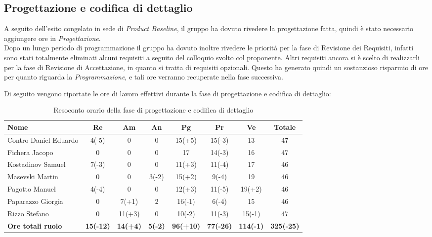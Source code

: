 \documentclass[../piano_di_progetto.tex]{subfiles}
\begin{document}
\clearpage
\subsection{Progettazione e codifica di dettaglio}%
\label{sub:cons_prog_dettaglio}

A seguito dell'esito congelato in sede di \emph{Product Baseline}, il gruppo ha dovuto rivedere la progettazione fatta, quindi è stato necessario aggiungere ore in \emph{Progettazione}.\\
Dopo un lungo periodo di programmazione il gruppo ha dovuto inoltre rivedere le priorità per la fase di Revisione dei Requisiti, infatti sono stati totalmente eliminati alcuni requisiti a seguito 
del colloquio svolto col proponente. Altri requisiti ancora si è scelto di realizzarli per la fase di Revisione di Accettazione, in quanto si tratta di requisiti opzionali. Questo ha generato quindi 
un sostanzioso risparmio di ore per quanto riguarda la \emph{Programmazione}, e tali ore verranno recuperate nella fase successiva.

\noindent Di seguito vengono riportate le ore di lavoro effettivi durante la fase di progettazione e codifica di dettaglio: \\
\begin{table}[!ht]
	\centering
	\begin{tabular}{|l|c|c|c|c|c|c|c|}
	\hline
	\rowcolor{lightgray}
	\textbf{Nome} & \textbf{Re} & \textbf{Am} & \textbf{An} & \textbf{Pg}  & \textbf{Pr}   & \textbf{Ve} & \textbf{Totale}\\
	\hline
	Contro Daniel Eduardo 	& 4(-5) & 0 	 & 0 	 & 15(+5) 	& 15(-3) 	& 13		& 47 \\
	Fichera Jacopo 			& 0 	& 0 	 & 0 	 & 17	 	& 14(-3) 	& 16 		& 47 \\
	Kostadinov Samuel 		& 7(-3) & 0 	 & 0 	 & 11(+3) 	& 11(-4) 	& 17 		& 46 \\			
	Masevski Martin 		& 0 	& 0 	 & 3(-2) & 15(+2) 	& 9(-4) 	& 19 		& 46 \\
	Pagotto Manuel 			& 4(-4)	& 0 	 & 0  	 & 12(+3) 	& 11(-5) 	& 19(+2)	& 46 \\			
	Paparazzo Giorgia		& 0		& 7(+1)  & 2 	 & 16(-1)	& 6(-4) 	& 15	 	& 46 \\
	Rizzo Stefano 			& 0 	& 11(+3) & 0 	 & 10(-2) 	& 11(-3) 	& 15(-1) 	& 47 \\
	\hline
	\textbf{Ore totali ruolo} & \textbf{15(-12)} & \textbf{14(+4)} & \textbf{5(-2)} & \textbf{96(+10)} & \textbf{77(-26)} & \textbf{114(-1)} & \textbf{325(-25)} \\
	\hline
	\end{tabular}
	\caption{Resoconto orario della fase di progettazione e codifica di dettaglio}
\end{table}
\end{document}
